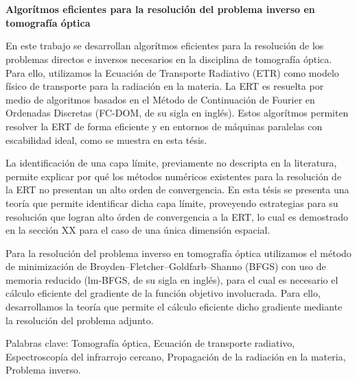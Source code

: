 \chapter*{}%
%

\begin{center}
\begin{large}
\textbf{Algorítmos eficientes para la resolución 
del problema inverso en tomografía óptica}
\end{large}
\end{center}

\vspace{1cm}
En este trabajo se desarrollan   
algorítmos eficientes para la resolución de los problemas directos 
e inversos necesarios en la disciplina de tomografía óptica. Para ello, utilizamos la Ecuación de Transporte 
Radiativo (ETR) como modelo físico de transporte para la radiación 
en la materia. 
La ERT es resuelta por medio de algoritmos basados en el Método  
de Continuación de Fourier en Ordenadas Discretas (FC-DOM, de su sigla en inglés). Estos algorítmos 
permiten resolver la ERT de forma eficiente y en entornos de máquinas paralelas 
con escabilidad ideal, como se muestra en esta tésis. 

La identificación de una capa límite, previamente no descripta en la literatura, 
permite explicar por qué los métodos numéricos existentes para la resolución de la ERT 
no presentan un alto orden de convergencia. En esta tésis se presenta 
una teoría que permite identificar dicha capa límite, proveyendo  
estrategias para su resolución que logran alto órden de convergencia 
a la ERT, lo cual es demostrado en la sección XX para el caso de una única dimensión espacial.

Para la resolución del problema inverso en tomografía óptica utilizamos el método de minimización 
de Broyden–Fletcher–Goldfarb–Shanno (BFGS) con uso de memoria reducido 
(lm-BFGS, de su sigla en inglés), 
para el cual es necesario el cálculo eficiente del gradiente 
de la función objetivo involucrada. Para ello, desarrollamos la teoría 
que permite el cálculo eficiente dicho gradiente  
mediante la resolución del problema adjunto. 


\vspace{1cm}
\noindent
Palabras clave: 
Tomografía óptica,
Ecuación de transporte radiativo, 
Espectroscopía del infrarrojo cercano, 
Propagación de la radiación en la materia,
Problema inverso.
